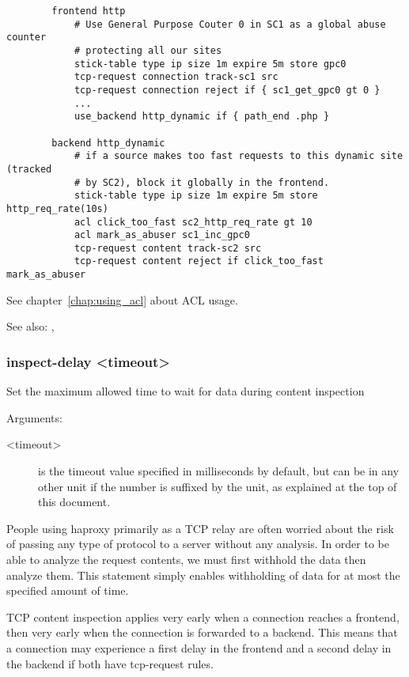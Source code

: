   \begin{verbatim}
        frontend http
            # Use General Purpose Couter 0 in SC1 as a global abuse counter
            # protecting all our sites
            stick-table type ip size 1m expire 5m store gpc0
            tcp-request connection track-sc1 src
            tcp-request connection reject if { sc1_get_gpc0 gt 0 }
            ...
            use_backend http_dynamic if { path_end .php }

        backend http_dynamic
            # if a source makes too fast requests to this dynamic site (tracked
            # by SC2), block it globally in the frontend.
            stick-table type ip size 1m expire 5m store http_req_rate(10s)
            acl click_too_fast sc2_http_req_rate gt 10
            acl mark_as_abuser sc1_inc_gpc0
            tcp-request content track-sc2 src
            tcp-request content reject if click_too_fast mark_as_abuser
  \end{verbatim}

  See chapter~\ref{chap:using_acl} about ACL usage.


See also: , 

\subsubsection[tcp-request inspect-delay]{ inspect-delay <timeout>}

  Set the maximum allowed time to wait for data during content inspection


  Arguments:
  \begin{description}
  \item[<timeout>] is the timeout value specified in milliseconds by default, but
              can be in any other unit if the number is suffixed by the unit,
              as explained at the top of this document.
  \end{description}

  People using haproxy primarily as a TCP relay are often worried about the
  risk of passing any type of protocol to a server without any analysis. In
  order to be able to analyze the request contents, we must first withhold
  the data then analyze them. This statement simply enables withholding of
  data for at most the specified amount of time.

  TCP content inspection applies very early when a connection reaches a
  frontend, then very early when the connection is forwarded to a backend. This
  means that a connection may experience a first delay in the frontend and a
  second delay in the backend if both have tcp-request rules.

